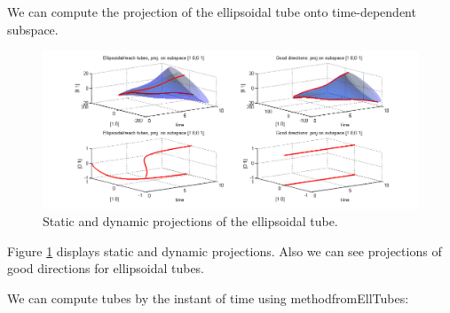 \documentclass[letterpaper,10pt,english]{sphinxmanual}
\begin{document}
We can compute the projection of the ellipsoidal
tube onto time-dependent subspace.
\begin{figure}[htbp]
\centering
\capstart

\includegraphics[width=1.000\linewidth]{chapter05_section03_reachTubeStatProjreachTubeDynProj.png}
\caption{Static and dynamic projections of the ellipsoidal tube.}\label{chap_implement:statdyn-proj}\end{figure}

Figure \hyperref[chap_implement:statdyn-proj]{ \ref*{chap_implement:statdyn-proj}} displays static and dynamic projections.
Also we can see projections of good directions for ellipsoidal tubes.

We can compute tubes by the instant of time using methodfromEllTubes:
\end{document}
